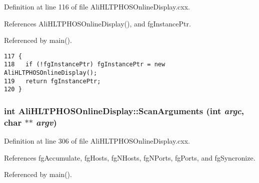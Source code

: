 Definition at line 116 of file Ali\-HLTPHOSOnline\-Display.cxx.

References Ali\-HLTPHOSOnline\-Display(), and fg\-Instance\-Ptr.

Referenced by main().

\footnotesize\begin{verbatim}117 {
118   if (!fgInstancePtr) fgInstancePtr = new AliHLTPHOSOnlineDisplay();
119   return fgInstancePtr;
120 }
\end{verbatim}\normalsize 


\subsubsection{\setlength{\rightskip}{0pt plus 5cm}int Ali\-HLTPHOSOnline\-Display::Scan\-Arguments (int {\em argc}, char $\ast$$\ast$ {\em argv})\hspace{0.3cm}{\tt  [static]}}\label{classAliHLTPHOSOnlineDisplay_e0}




Definition at line 306 of file Ali\-HLTPHOSOnline\-Display.cxx.

References fg\-Accumulate, fg\-Hosts, fg\-NHosts, fg\-NPorts, fg\-Ports, and fg\-Syncronize.

Referenced by main().

